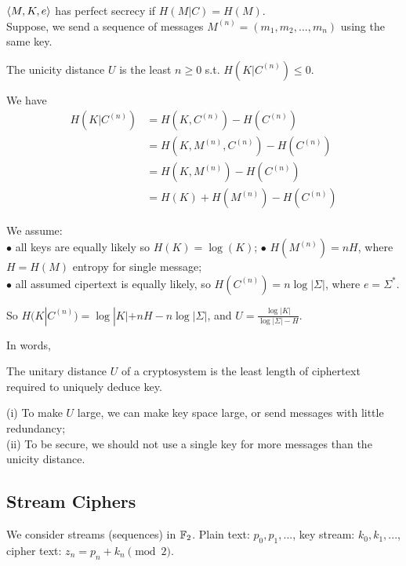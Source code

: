 \documentclass[a4paper]{article}
\begin{document}
\begin{rem}
$\langle M,K,e \rangle$ has perfect secrecy if $H(M|C) = H(M)$.\\
Suppose, we send a sequence of messages $M^{(n)} = (m_1,m_2,...,m_n)$ using the same key.
\end{rem}

\begin{defi}
The unicity distance $U$ is the least $n \geq 0$ s.t. $H(K| C^{(n)}) \leq 0$.
\end{defi}

We have
\begin{equation*}
\begin{aligned}
H(K|C^{(n)}) &= H(K,C^{(n)}) - H(C^{(n)})\\
&= H(K,M^{(n)},C^{(n)}) - H(C^{(n)})\\
&= H(K,M^{(n)}) - H(C^{(n)})\\
&= H(K) + H(M^{(n)}) - H(C^{(n)})
\end{aligned}
\end{equation*}

We assume:\\
$\bullet$ all keys are equally likely so $H(K) = \log (K)$;
$\bullet$ $H(M^{(n)})=nH$, where $H=H(M)$ entropy for single message;\\
$\bullet$ all assumed cipertext is equally likely, so $H(C^{(n)}) = n \log |\Sigma|$, where $e = \Sigma^*$.

So $H(K|C^{(n)}) = \log |K| + nH - n\log |\Sigma|$, and $U =\frac{\log |K|}{\log |\Sigma|-H}$.

In words,

\begin{defi}
The unitary distance $U$ of a cryptosystem is the least length of ciphertext required to uniquely deduce key.
\end{defi}

\begin{rem}
(i) To make $U$ large, we can make key space large, or send messages with little redundancy;\\
(ii) To be secure, we should not use a single key for more messages than the unicity distance.
\end{rem}

\subsection{Stream Ciphers}
We consider streams (sequences) in $\mathbb{F}_2$. Plain text: $p_0,p_1,...$, key stream: $k_0,k_1,...$, cipher text: $z_n = p_n + k_n \pmod 2$.
\end{document}
